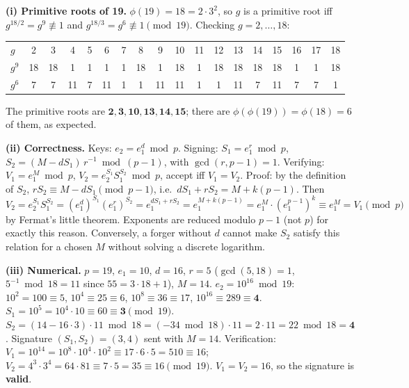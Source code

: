 \textbf{(i) Primitive roots of 19.} $\phi(19) = 18 = 2 \cdot 3^2$, so $g$ is a primitive root iff $g^{18/2} = g^9 \not\equiv 1$ and $g^{18/3} = g^6 \not\equiv 1 \pmod{19}$. Checking $g = 2, \dots, 18$:
\begin{center}\small
\begin{tabular}{@{}l*{17}{c}@{}}
\toprule
$g$ & 2&3&4&5&6&7&8&9&10&11&12&13&14&15&16&17&18\\
$g^9$ & 18&18&1&1&1&1&18&1&18&1&18&18&18&18&1&1&18\\
$g^6$ & 7&7&11&7&11&1&1&11&11&1&1&11&7&11&7&7&1\\
\bottomrule
\end{tabular}
\end{center}
The primitive roots are $\mathbf{2, 3, 10, 13, 14, 15}$; there are $\phi(\phi(19)) = \phi(18) = 6$ of them, as expected.

\textbf{(ii) Correctness.} Keys: $e_2 = e_1^d \bmod p$. Signing: $S_1 = e_1^r \bmod p$, $S_2 = (M - d S_1)\, r^{-1} \bmod (p - 1)$, with $\gcd(r, p - 1) = 1$. Verifying: $V_1 = e_1^M \bmod p$, $V_2 = e_2^{S_1} S_1^{S_2} \bmod p$, accept iff $V_1 = V_2$. Proof: by the definition of $S_2$, $r S_2 \equiv M - d S_1 \pmod{p - 1}$, i.e.\ $d S_1 + r S_2 = M + k(p - 1)$. Then
\[
V_2 = e_2^{S_1} S_1^{S_2} = (e_1^{d})^{S_1} (e_1^{r})^{S_2} = e_1^{d S_1 + r S_2} = e_1^{M + k(p-1)} = e_1^M \cdot (e_1^{p-1})^k \equiv e_1^M = V_1 \pmod p
\]
by Fermat's little theorem. Exponents are reduced modulo $p - 1$ (not $p$) for exactly this reason. Conversely, a forger without $d$ cannot make $S_2$ satisfy this relation for a chosen $M$ without solving a discrete logarithm.

\textbf{(iii) Numerical.} $p = 19$, $e_1 = 10$, $d = 16$, $r = 5$ ($\gcd(5, 18) = 1$, $5^{-1} \bmod 18 = 11$ since $55 = 3 \cdot 18 + 1$), $M = 14$.
$e_2 = 10^{16} \bmod 19$: $10^2 = 100 \equiv 5$, $10^4 \equiv 25 \equiv 6$, $10^8 \equiv 36 \equiv 17$, $10^{16} \equiv 289 \equiv \mathbf 4$.
$S_1 = 10^5 = 10^4 \cdot 10 \equiv 60 \equiv \mathbf 3 \pmod{19}$.
$S_2 = (14 - 16 \cdot 3) \cdot 11 \bmod 18 = (-34 \bmod 18) \cdot 11 = 2 \cdot 11 = 22 \bmod 18 = \mathbf 4$.
Signature $(S_1, S_2) = (3, 4)$ sent with $M = 14$.
Verification: $V_1 = 10^{14} = 10^8 \cdot 10^4 \cdot 10^2 \equiv 17 \cdot 6 \cdot 5 = 510 \equiv 16$; $V_2 = 4^3 \cdot 3^4 = 64 \cdot 81 \equiv 7 \cdot 5 = 35 \equiv 16 \pmod{19}$. $V_1 = V_2 = 16$, so the signature is \textbf{valid}.

